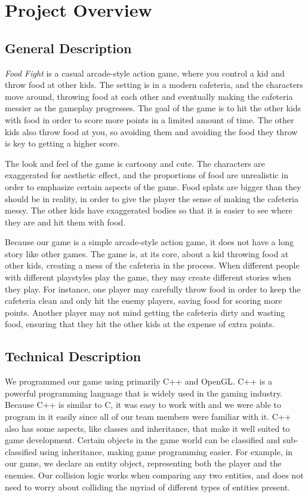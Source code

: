 \documentclass{article}
\begin{document}
\section{Project Overview}

\subsection{General Description}

\textit{Food Fight} is a casual arcade-style action game, where you control a kid and
throw food at other kids. The setting is in a modern cafeteria, and the
characters move around, throwing food at each other and eventually making the
cafeteria messier as the gameplay progresses. The goal of the game is to hit the
other kids with food in order to score more points in a limited amount of time. The other kids also throw food at you, so
avoiding them and avoiding the food they throw is key to getting a higher score.

The look and feel of the game is cartoony and cute. The characters are
exaggerated for aesthetic effect, and the proportions of food are unrealistic in
order to emphasize certain aspects of the game. Food splats are bigger than they
should be in reality, in order to give the player the sense of making the
cafeteria messy. The other kids have exaggerated bodies so that it is easier to
see where they are and hit them with food.

Because our game is a simple arcade-style action game, it does not have a long
story like other games. The game is, at its core, about a kid throwing food at
other kids, creating a mess of the cafeteria in the process. When different
people with different playstyles play the game, they may create different
stories when they play. For instance, one player may carefully throw food in
order to keep the cafeteria clean and only hit the enemy players, saving food
for scoring more points. Another player may not mind getting the cafeteria dirty
and wasting food, ensuring that they hit the other kids at the expense of extra
points.

\subsection{Technical Description}

We programmed our game using primarily C++ and OpenGL. C++ is a powerful
programming language that is widely used in the gaming industry. Because C++ is
similar to C, it was easy to work with and we were able to program in it easily
since all of our team members were familiar with it. C++ also has some aspects,
like classes and inheritance, that make it well suited to game development.
Certain objects in the game world can be classified and sub-classified using
inheritance, making game programming easier. For example, in our game, we
declare an entity object, representing both the player and the enemies. Our
collision logic works when comparing any two entities, and does not need to
worry about colliding the myriad of different types of entities present.
 
\end{document}
